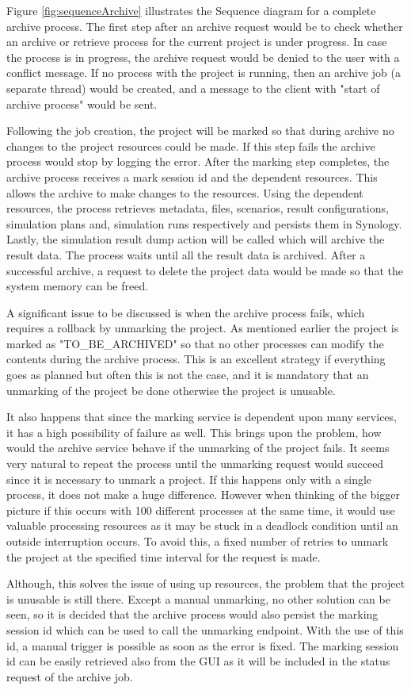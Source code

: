 Figure \ref{fig:sequenceArchive} illustrates the Sequence diagram for a complete archive process. The first step after an archive request would be to check
whether an archive or retrieve process for the current project is under progress. In case the process is in progress, the archive request would be denied to the
user with a conflict message. If no process with the project is running, then an archive job (a separate thread) would be created, and a message to the client with "start of archive process" would be
sent. 

Following the job creation, the project will be marked so that during archive no changes to the project resources could be made. If this step fails the archive 
process would stop by logging the error. After the marking step completes, the archive process receives a mark session id and the dependent resources. This allows the archive to make
changes to the resources. Using the dependent resources, the process retrieves metadata, files, scenarios, result configurations, simulation plans and, simulation runs 
respectively and persists them in Synology. Lastly, the simulation result dump action will be called which will archive the result data. The process waits until
all the result data is archived. After a successful archive, a request to delete the project data would be made so that the system memory can be freed.

A significant issue to be discussed is when the archive process fails, which requires a rollback by unmarking the project. As mentioned earlier the project is
marked as "TO\_BE\_ARCHIVED" so that no other processes can modify the contents during the archive process. This is an excellent strategy if everything goes as planned but 
often this is not the case, and it is mandatory that an unmarking of the project be done otherwise the project is unusable. 

It also happens that since the
marking service is dependent upon many services, it has a high possibility of failure as well. This brings upon the problem, how would the archive service behave if the
unmarking of the project fails. It seems very natural to repeat the process until the unmarking request would succeed since it is necessary to unmark
a project. If this happens only with a single process, it does not make a huge difference. However when thinking of the bigger picture if this 
occurs with 100 different processes at the same time, it would use valuable processing resources as it may be stuck in a deadlock condition until an outside interruption occurs. 
To avoid this, a fixed number of retries to unmark the project at the specified time interval for the request is made. 

Although, this solves the issue of using up resources, the problem that the project is unusable is still there. Except a manual unmarking, no other solution 
can be seen, so 
it is decided that the archive process would also persist the marking session id which can be used to call the unmarking endpoint. With the use of this id, a manual 
trigger is possible as soon as the error is fixed. The marking session id can be easily retrieved also from the GUI as it will be included in the status request of
the archive job.
 